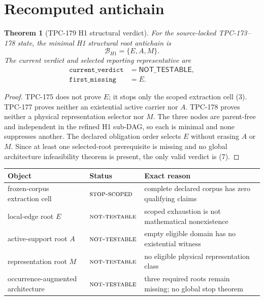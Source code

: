 \documentclass[11pt]{article}
\newtheorem{theorem}{Theorem}[section]
\theoremstyle{definition}
\theoremstyle{remark}
\newcommand{\NT}{\textnormal{\textsc{not-testable}}}
\newcommand{\STOP}{\textnormal{\textsc{stop-scoped}}}
\begin{document}
\section{Recomputed antichain}

\begin{theorem}[TPC-179 H1 structural verdict]
For the source-locked TPC-173--178 state, the minimal H1 structural
root antichain is
\[
 \mathcal B_{H1}=\{E,A,M\}.                                      \tag{6}
\]
The current verdict and selected reporting representative are
\[
\begin{aligned}
 \texttt{current\_verdict}&=\mathsf{NOT\_TESTABLE},\\
 \texttt{first\_missing}&=E.
\end{aligned}                                                     \tag{7}
\]
\end{theorem}

\begin{proof}
TPC-175 does not prove \(E\); it stops only the scoped extraction cell
(3).  TPC-177 proves neither an existential active carrier nor \(A\).
TPC-178 proves neither a physical representation selector nor \(M\).
The three nodes are parent-free and independent in the refined H1
sub-DAG, so each is minimal and none suppresses another.  The declared
obligation order selects \(E\) without erasing \(A\) or \(M\).
Since at least one selected-root prerequisite is missing and no
global architecture infeasibility theorem is present, the only valid
verdict is (7).
\end{proof}

\begin{center}
\begin{tabularx}{0.98\linewidth}{@{}l l Y@{}}
\toprule
Object & Status & Exact reason\\
\midrule
frozen-corpus extraction cell & \(\STOP\) &
complete declared corpus has zero qualifying claims\\
local-edge root \(E\) & \(\NT\) &
scoped exhaustion is not mathematical nonexistence\\
active-support root \(A\) & \(\NT\) &
empty eligible domain has no existential witness\\
representation root \(M\) & \(\NT\) &
no eligible physical representation class\\
occurrence-augmented architecture & \(\NT\) &
three required roots remain missing; no global stop theorem\\
\bottomrule
\end{tabularx}
\end{center}
\end{document}
